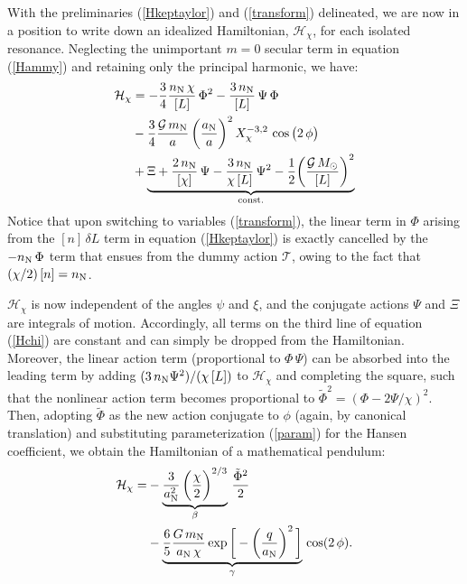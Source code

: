 \documentclass[twocolumn]{aastex62}
\newcommand{\G}{\mathcal{G}}
\newcommand{\Msun}{M_{\odot}}
\newcommand{\Ham}{\mathcal{H}}
\newcommand{\mn}{m_{\rm{N}}}
\newcommand{\an}{a_{\rm{N}}}
\begin{document}
With the preliminaries (\ref{Hkeptaylor}) and (\ref{transform}) delineated, we are now in a position to write down an idealized Hamiltonian, $\Ham_{\chi}$, for each isolated resonance. Neglecting the unimportant $m=0$ secular term in equation (\ref{Hammy}) and retaining only the principal harmonic, we have:
\begin{align}
\Ham_{\chi}&=-\frac{3}{4}\frac{n_{\rm{N}}\,\chi}{[L]} \, \Phi^2-\frac{3\,n_{\rm{N}}}{[L]}\,\Psi\,\Phi \nonumber \\
&- \frac{3}{4} \frac{\G\,\mn}{a}\, \bigg(\frac{a_{\rm{N}}}{a} \bigg)^2\,X_{\chi}^{-3,2}\,\cos\big(2\,\phi \big) \nonumber \\
&+\underbrace{\Xi + \frac{2\,n_{\rm{N}}}{[\chi]}\,\Psi-\frac{3\,n_{\rm{N}}}{\chi\,[L]}\,\Psi^2 -\frac{1}{2}\bigg(\frac{\G\,\Msun}{[L]} \bigg)^2}_{\rm{const.}}
\label{Hchi}
\end{align}
Notice that upon switching to variables (\ref{transform}), the linear term in $\Phi$ arising from the $[n]\,\delta L$ term in equation (\ref{Hkeptaylor}) is exactly cancelled by the $-n_{\rm{N}}\,\Phi$ term that ensues from the dummy action $\mathcal{T}$, owing to the fact that $(\chi/2)\,[n]=n_{\rm{N}}$.

$\Ham_{\chi}$ is now independent of the angles $\psi$ and $\xi$, and the conjugate actions $\Psi$ and $\Xi$ are integrals of motion. Accordingly, all terms on the third line of equation (\ref{Hchi}) are constant and can simply be dropped from the Hamiltonian. Moreover, the linear action term (proportional to $\Phi\,\Psi$) can be absorbed into the leading term by adding $(3\,n_{\rm{N}}\Psi^2)/(\chi\,[L])$ to $\Ham_{\chi}$ and completing the square, such that the nonlinear action term becomes proportional to $\tilde{\Phi}^2=(\Phi-2\Psi/\chi)^2$. Then, adopting $\tilde{\Phi}$ as the new action conjugate to $\phi$ (again, by canonical translation) and substituting parameterization (\ref{param}) for the Hansen coefficient, we obtain the Hamiltonian of a mathematical pendulum:
\begin{align}
\Ham_{\chi}=&-\underbrace{\frac{3}{\an^2}\,\bigg( \frac{\chi}{2} \bigg)^{2/3}}_{\beta}\,\frac{\tilde{\Phi}^2}{2}\nonumber \\
&-\underbrace{\frac{6}{5}\frac{G\,\mn}{\an\,\chi}\exp\bigg[-\bigg(\frac{q}{\an}\bigg)^2\,\bigg]}_{\gamma}\,\cos(2\,\phi).
\label{Hchi2}
\end{align}
\end{document}
